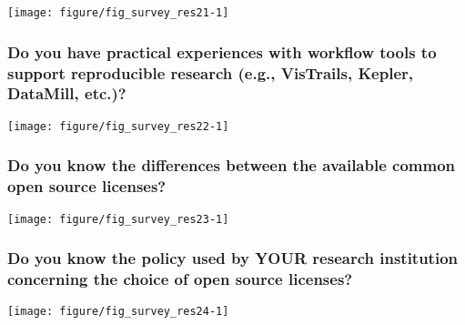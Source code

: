 \documentclass{article}\usepackage[]{graphicx}\usepackage[]{color}
\newenvironment{knitrout}{}{}
\begin{document}
\begin{knitrout}
\color{fgcolor}

{\centering \texttt{[image: figure/fig\_survey\_res21-1]} 

}



\end{knitrout}





\subsubsection{Do you have practical experiences with workflow tools to support reproducible research (e.g., VisTrails, Kepler, DataMill, etc.)?}

\begin{knitrout}
\color{fgcolor}

{\centering \texttt{[image: figure/fig\_survey\_res22-1]} 

}



\end{knitrout}





\subsubsection{Do you know the differences between the available common open source licenses?}

\begin{knitrout}
\color{fgcolor}

{\centering \texttt{[image: figure/fig\_survey\_res23-1]} 

}



\end{knitrout}




\subsubsection{Do you know the policy used by YOUR research institution concerning the choice of open source licenses?}

\begin{knitrout}
\color{fgcolor}

{\centering \texttt{[image: figure/fig\_survey\_res24-1]} 

}



\end{knitrout}
\end{document}
